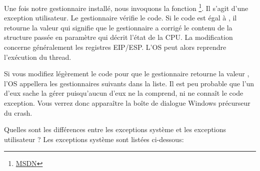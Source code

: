 

Une fois notre gestionnaire installé, nous invoquons la fonction 
\footnote{\href{http://go.yurichev.com/17253}{MSDN}}.
Il s'agit d'une exception utilisateur.
Le gestionnaire vérifie le code.
Si le code est égal à , il retourne la valeur  qui
signifie que le gestionnaire a corrigé le contenu de la structure passée en paramètre qui décrit
l'état de la CPU. La modification concerne généralement les registres EIP/ESP. L'\ac{OS} peut alors
reprendre l'exécution du thread.

Si vous modifiez légèrement le code pour que le gestionnaire retourne la valeur ,
l'\ac{OS} appellera les gestionnaires suivants dans la liste. Il est peu probable que l'un d'eux sache
la gérer puisqu'aucun d'eux ne la comprend, ni ne connaît le code exception.
Vous verrez donc apparaître la boîte de dialogue Windows précurseur du crash.

Quelles sont les différences entre les exceptions système et les exceptions utilisateur ?
Les exceptions système sont listées ci-dessous:

